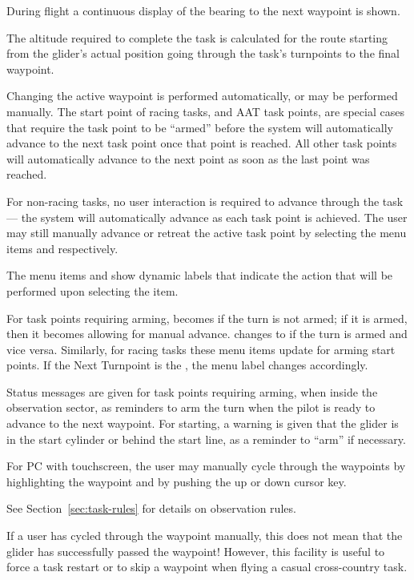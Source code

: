 During flight a continuous display of the bearing to the next waypoint is shown.

The altitude required to complete the task is calculated for the route starting
from the glider's actual position going through the task's turnpoints to the 
final waypoint.

Changing the active waypoint is performed automatically, or may be performed manually.
The start point of racing tasks, and AAT task points, are special cases that require
the task point to be ``armed'' before the system will automatically advance to the next
task point once that point is reached.  All other task points will automatically
advance to the next point as soon as the last point was reached.

For non-racing tasks, no user interaction is required to
advance through the task --- the system will automatically advance as
each task point is achieved.  The user may still manually advance or retreat the active
task point by selecting the menu items \blink{} and
\blink{} respectively.

The menu items  and
 show dynamic labels that
indicate the action that will be performed upon selecting the item.

For task points requiring arming,  becomes 
 if the turn is not armed; if it is armed, then it becomes 
 allowing for manual advance. 
 changes to  if the turn is armed 
and vice versa. Similarly, for racing tasks these menu items update for arming 
start points. If the Next Turnpoint is the , the menu 
label changes accordingly.

Status messages are given for task points requiring arming, when
inside the observation sector, as reminders to arm the turn when the
pilot is ready to advance to the next waypoint. For starting, a
warning is given that the glider is in the start cylinder or behind
the start line, as a reminder to ``arm'' if necessary.

For PC with touchscreen, the user may
manually cycle through the waypoints by highlighting the waypoint
and by pushing the up or down cursor key.

See Section~\ref{sec:task-rules} for details on observation rules.

If a user has cycled through the waypoint manually, this does not mean
that the glider has successfully passed the waypoint!  However, this
facility is useful to force a task restart or to skip a waypoint when
flying a casual cross-country task.

